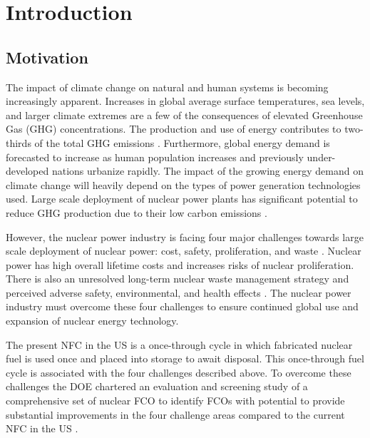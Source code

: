 \chapter[Introduction]{Introduction}
\label{chap:1}

\section{Motivation}

The impact of climate change on natural and human systems 
is becoming increasingly apparent.
Increases in global average 
surface temperatures, sea levels, and larger climate extremes
are a few of the consequences of elevated Greenhouse Gas (GHG) 
concentrations.
The production and use of energy contributes to 
two-thirds of the total GHG emissions \cite{noauthor_climate_2018}. 
Furthermore, global energy demand is forecasted to increase as human 
population increases and previously under-developed nations 
urbanize rapidly. 
The impact of the growing energy demand on climate change 
will heavily depend on the 
types of power generation technologies used. 
Large scale deployment of nuclear power plants has significant 
potential to reduce GHG production due to their low 
carbon emissions \cite{noauthor_climate_2018}.  

However, the nuclear power industry is facing four major challenges 
towards large scale deployment of nuclear power: 
cost, safety, proliferation, and waste 
\cite{massachusetts_institute_of_technology_future_2003}. 
Nuclear power has high overall lifetime costs and increases 
risks of nuclear proliferation. 
There is also an unresolved long-term nuclear waste management 
strategy and perceived adverse safety, environmental, and health 
effects \cite{massachusetts_institute_of_technology_future_2003}. 
The nuclear power industry must overcome these four challenges 
to ensure continued global use and expansion 
of nuclear energy technology. 

The present \gls{NFC} in the \gls{US} is a once-through cycle 
in which fabricated nuclear fuel is used once and placed into 
storage to await disposal. 
This once-through fuel cycle is associated with the four
challenges described above.
To overcome these challenges the 
\gls{DOE} chartered an evaluation and screening study 
of a comprehensive set of nuclear \gls{FCO} 
to identify \glspl{FCO} with potential 
to provide substantial improvements in the four challenge areas
compared to the current 
\gls{NFC} in the \gls{US} \cite{wigeland_nuclear_2014}. 

